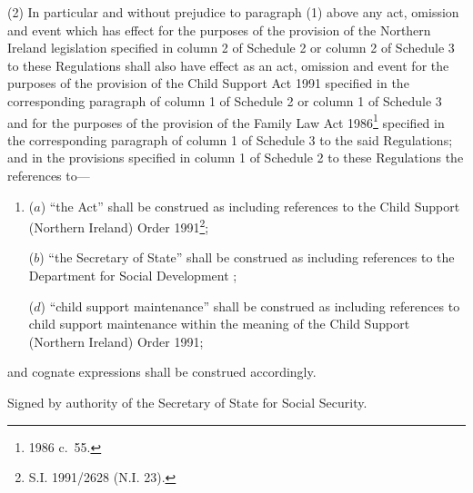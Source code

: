 \documentclass[12pt,a4paper]{article}
\begin{document}
(2) In particular and without prejudice to paragraph (1) above any act, omission and event which has effect for the purposes of the provision of the Northern Ireland legislation specified in column 2 of Schedule 2 
or column 2 of Schedule 3  %
to these Regulations shall also have effect as an act, omission and event for the purposes of the provision of the Child Support Act 1991 specified in the corresponding paragraph of column 1 of Schedule 2 
or column 1 of Schedule 3 and for the purposes of the provision of the Family Law Act 1986\footnote{1986 c.\ 55.} specified in the corresponding paragraph of column 1 of Schedule 3  %
to the said Regulations; and in the provisions specified in column 1 of Schedule 2 to these Regulations the references to—
\begin{enumerate}\item[]
($a$) “the Act” shall be construed as including references to the Child Support (Northern Ireland) Order 1991\footnote{\frenchspacing S.I. 1991/2628 (N.I. 23).};

($b$) “the Secretary of State” shall be construed as including references to the Department 
for Social Development%
;


($d$) “child support maintenance” shall be construed as including references to child support maintenance within the meaning of the Child Support (Northern Ireland) Order 1991;
\end{enumerate}
and cognate expressions shall be construed accordingly.


\bigskip

Signed by authority of the Secretary of State for Social Security.
\end{document}
